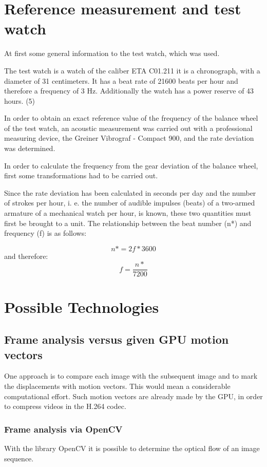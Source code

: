 \documentclass[12pt, a4paper]{report}
\begin{document}
\section{Reference measurement and test watch}
At first some general information to the test watch, which was used.

The test watch is a watch of the caliber ETA C01.211 it is a chronograph, with a diameter of 31 centimeters. It has a beat rate of 21600 beats per hour and therefore a frequency of 3 Hz. Additionally the watch has a power reserve of 43 hours. (5)

In order to obtain an exact reference value of the frequency of the balance wheel of the test watch, an acoustic measurement was carried out with a professional measuring device, the Greiner Vibrograf - Compact 900, and the rate deviation was determined. 

In order to calculate the frequency from the gear deviation of the balance wheel, first some transformations had to be carried out. 

Since the rate deviation has been calculated in seconds per day and the number of strokes per hour, i. e. the number of audible impulses (beats) of a two-armed armature of a mechanical watch per hour, is known, these two quantities must first be brought to a unit. The relationship between the beat number (n*) and frequency (f) is as follows: 

\begin{displaymath}
n* = 2f*3600
 \end{displaymath}
 and therefore:
 \begin{displaymath}
  f = \frac{n*}{7200}
 \end{displaymath}


\section {Possible Technologies}
\subsection{Frame analysis versus given GPU motion vectors}
One approach is to compare each image with the subsequent image and to mark the displacements with motion vectors. This would mean a considerable computational effort.
Such motion vectors are already made by the GPU, in order to compress videos in the H.264 codec.

\subsubsection{Frame analysis via OpenCV}
With the library OpenCV it is possible to determine the optical flow of an image sequence. 
\end{document}
